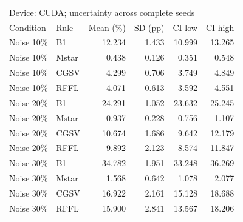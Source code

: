 \begin{tabular}{llrrrr}
\toprule
\multicolumn{6}{l}{Device: CUDA; uncertainty across complete seeds} \\
Condition & Rule & Mean (\%) & SD (pp) & CI low & CI high \\
\midrule
Noise 10\% & B1 & 12.234 & 1.433 & 10.999 & 13.265 \\
Noise 10\% & Mstar & 0.438 & 0.126 & 0.351 & 0.548 \\
Noise 10\% & CGSV & 4.299 & 0.706 & 3.749 & 4.849 \\
Noise 10\% & RFFL & 4.071 & 0.613 & 3.592 & 4.551 \\
Noise 20\% & B1 & 24.291 & 1.052 & 23.632 & 25.245 \\
Noise 20\% & Mstar & 0.937 & 0.228 & 0.756 & 1.107 \\
Noise 20\% & CGSV & 10.674 & 1.686 & 9.642 & 12.179 \\
Noise 20\% & RFFL & 9.892 & 2.123 & 8.574 & 11.847 \\
Noise 30\% & B1 & 34.782 & 1.951 & 33.248 & 36.269 \\
Noise 30\% & Mstar & 1.568 & 0.642 & 1.078 & 2.077 \\
Noise 30\% & CGSV & 16.922 & 2.161 & 15.128 & 18.688 \\
Noise 30\% & RFFL & 15.900 & 2.841 & 13.567 & 18.206 \\
\bottomrule
\end{tabular}

